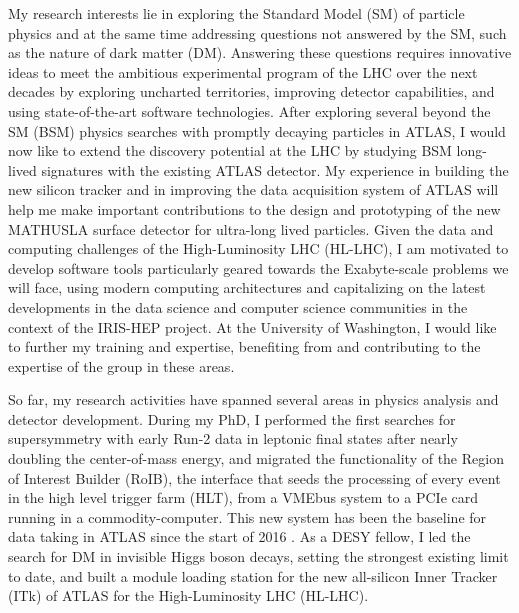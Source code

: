 \documentclass[a4paper]{article}
\begin{document}
\thispagestyle{fancy} 
 \lfoot{} \rfoot{\bf \thepage} \cfoot{}

\fontsize{11}{14}
\selectfont


My research interests lie in exploring the Standard Model (SM) of particle physics and at the same time addressing questions not answered by the SM, such as the nature of dark matter (DM). Answering these questions requires innovative ideas to meet the ambitious experimental program of the LHC over the next decades by exploring uncharted territories, improving detector capabilities, and using state-of-the-art software technologies. After exploring several beyond the SM (BSM) physics searches with promptly decaying particles in ATLAS, I would now like to extend the discovery potential at the LHC by studying BSM long-lived signatures with the existing ATLAS detector. My experience in building the new silicon tracker and in improving the data acquisition system of ATLAS will help me make important contributions to the design and prototyping of the new MATHUSLA surface detector for ultra-long lived particles. Given the data and computing challenges of the High-Luminosity LHC (HL-LHC), I am motivated to develop software tools particularly geared towards the Exabyte-scale problems we will face, using modern computing architectures and capitalizing on the latest developments in the data science and computer science communities in the context of the IRIS-HEP project. At the University of Washington, I would like to further my training and expertise, benefiting from and contributing to the expertise of the group in these areas.

\bigskip

So far, my research activities have spanned several areas in physics analysis and detector development. During my PhD, I performed the first searches for supersymmetry with early Run-2 data in leptonic final states after nearly doubling the center-of-mass energy\cite{RoIB}, and migrated the functionality of the Region of Interest Builder (RoIB), the interface that seeds the processing of every event in the high level trigger farm (HLT), from a VMEbus system to a PCIe card running in a commodity-computer. This new system has been the baseline for data taking in ATLAS since the start of 2016 \cite{RoIB}. As a DESY fellow, I led the search for DM in invisible Higgs boson decays, setting the strongest existing limit to date, and built a module loading station for the new all-silicon Inner Tracker (ITk) of ATLAS for the High-Luminosity LHC (HL-LHC).
\end{document}
